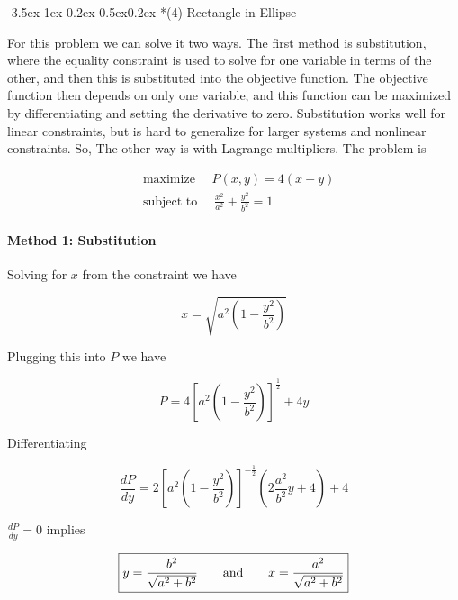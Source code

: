 \documentclass[11pt,letterpaper,onecolumn,notitlepage]{article}
\makeatletter
\renewcommand\subsection{\@startsection{subsection}{1}{\z@}%
{-3.5ex\@plus-1ex\@minus-0.2ex}%
{0.5ex\@plus0.2ex}%
{\fontsize{10pt}{10pt}\selectfont\bfseries\sffamily}}
\makeatother
\begin{document}
  \subsection*{(4) Rectangle in Ellipse}

  For this problem we can solve it two ways.
  The first method is substitution, where the equality constraint is used to solve for one variable in terms of the other, and then this is substituted into the objective function.
  The objective function then depends on only one variable, and this function can be maximized by differentiating and setting the derivative to zero.
  Substitution works well for linear constraints, but is hard to generalize for larger systems and nonlinear constraints.
  So, The other way is with Lagrange multipliers.
  The problem is

  \begin{align*}
    &\text{maximize }\quad P(x,y)=4(x+y) \\
    &\text{subject to }\quad\frac{x^{2}}{a^{2}}+\frac{y^{2}}{b^{2}}=1
  \end{align*}

  \paragraph{Method 1: Substitution}

  Solving for $x$ from the constraint we have

  \begin{equation*}
    x=\sqrt{a^{2}\left(1-\frac{y^{2}}{b^{2}}\right)}
  \end{equation*}

  Plugging this into $P$ we have

  \begin{equation*}
    P=4\left[a^{2}\left(1-\frac{y^{2}}{b^{2}}\right)\right]^{\frac{1}{2}}+4y
  \end{equation*}

  Differentiating

  \begin{equation*}
    \frac{dP}{dy}=2\left[a^{2}\left(1-\frac{y^{2}}{b^{2}}\right)\right]^{-\frac{1}{2}}\left(2\frac{a^{2}}{b^{2}}y+4\right)+4
  \end{equation*}

  $\frac{dP}{dy}=0$ implies

  \begin{equation*}
    \boxed{%
      y=\frac{b^{2}}{\sqrt{a^{2}+b^{2}}}
      \qquad\text{and}\qquad
      x=\frac{a^{2}}{\sqrt{a^{2}+b^{2}}}}
  \end{equation*}
\end{document}
